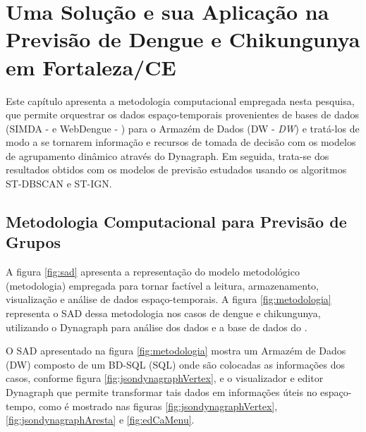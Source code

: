 \chapter{Uma Solução e sua Aplicação na Previsão de Dengue e Chikungunya em Fortaleza/CE}
\label{chap:avaliacao}

Este capítulo apresenta a metodologia computacional empregada nesta pesquisa, que permite orquestrar os dados espaço-temporais provenientes de bases de dados (\acrshort{SIMDA} - \cite{simda} e WebDengue - \cite{webdengue2011}) para o Armazém de Dados (\acrshort{DW} - \textit{\acrlong{DW}}) e tratá-los de modo a se tornarem informação e recursos de tomada de decisão com os modelos de agrupamento dinâmico através do Dynagraph. Em seguida, trata-se dos resultados obtidos com os modelos de previsão estudados usando os algoritmos \acrshort{ST-DBSCAN} e \acrshort{ST-IGN}.

\section{Metodologia Computacional para Previsão de Grupos}

A figura \ref{fig:sad} apresenta a representação do modelo metodológico (metodologia) empregada para tornar factível a leitura, armazenamento, visualização e análise de dados espaço-temporais. A figura \ref{fig:metodologia} representa o \acrshort{SAD} dessa metodologia nos casos de dengue e chikungunya, utilizando o Dynagraph para análise dos dados e a base de dados do .

\begin{figure}[!ht]
	\centering	
\end{figure}
\FloatBarrier

O SAD apresentado na figura \ref{fig:metodologia} mostra um Armazém de Dados (\acrlong{DW}) composto de um \acrfull{BD-SQL} (\acrfull{SQL}) onde são colocadas as informações dos casos, conforme figura \ref{fig:jsondynagraphVertex}, e o visualizador e editor Dynagraph que permite transformar tais dados em informações úteis no espaço-tempo, como é mostrado nas figuras \ref{fig:jsondynagraphVertex}, \ref{fig:jsondynagraphAresta} e \ref{fig:edCaMenu}.

